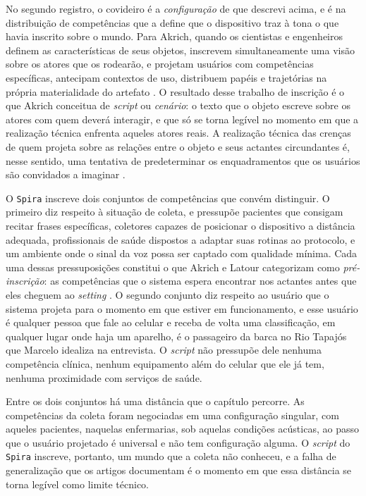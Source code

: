 No segundo registro, o covideiro é a \textit{configuração} de \textcite{Akrich1992Description} que descrevi acima, e é na distribuição de competências que a define que o dispositivo traz à tona o que havia inscrito sobre o mundo. Para Akrich, quando os cientistas e engenheiros definem as características de seus objetos, inscrevem simultaneamente uma visão sobre os atores que os rodearão, e projetam usuários com competências específicas, antecipam contextos de uso, distribuem papéis e trajetórias na própria materialidade do artefato \parencite{Akrich1992Description}. O resultado desse trabalho de inscrição é o que Akrich conceitua de \textit{script} ou \textit{cenário}: o texto que o objeto escreve sobre os atores com quem deverá interagir, e que só se torna legível no momento em que a realização técnica enfrenta aqueles atores reais. A realização técnica das crenças de quem projeta sobre as relações entre o objeto e seus actantes circundantes é, nesse sentido, uma tentativa de predeterminar os enquadramentos que os usuários são convidados a imaginar \parencite{Akrich1992Description}.

O \texttt{Spira} inscreve dois conjuntos de competências que convém distinguir. O primeiro diz respeito à situação de coleta, e pressupõe pacientes que consigam recitar frases específicas, coletores capazes de posicionar o dispositivo a distância adequada, profissionais de saúde dispostos a adaptar suas rotinas ao protocolo, e um ambiente onde o sinal da voz possa ser captado com qualidade mínima. Cada uma dessas pressuposições constitui o que Akrich e Latour categorizam como \textit{pré-inscrição}: as competências que o sistema espera encontrar nos actantes antes que eles cheguem ao \textit{setting} \parencite{AkrichLatour1992Convenient}. O segundo conjunto diz respeito ao usuário que o sistema projeta para o momento em que estiver em funcionamento, e esse usuário é qualquer pessoa que fale ao celular e receba de volta uma classificação, em qualquer lugar onde haja um aparelho, é o passageiro da barca no Rio Tapajós que Marcelo idealiza na entrevista. O \textit{script} não pressupõe dele nenhuma competência clínica, nenhum equipamento além do celular que ele já tem, nenhuma proximidade com serviços de saúde.

Entre os dois conjuntos há uma distância que o capítulo percorre. As competências da coleta foram negociadas em uma configuração singular, com aqueles pacientes, naquelas enfermarias, sob aquelas condições acústicas, ao passo que o usuário projetado é universal e não tem configuração alguma. O \textit{script} do \texttt{Spira} inscreve, portanto, um mundo que a coleta não conheceu, e a falha de generalização que os artigos documentam é o momento em que essa distância se torna legível como limite técnico.

